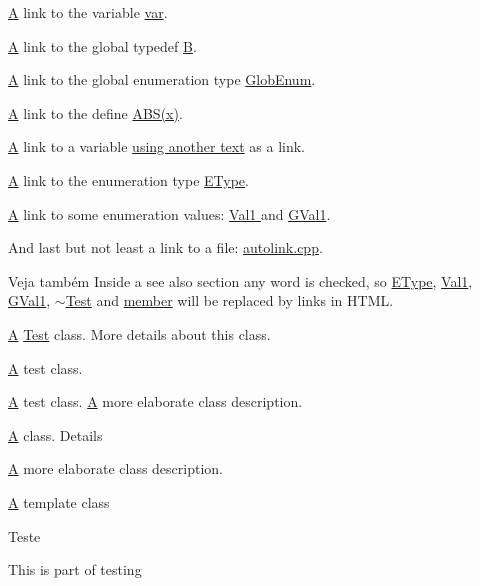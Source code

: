 \hyperlink{class_a}{A} link to the variable \hyperlink{class_test_a96c77f9f3a7baec84b9b8add26a31787}{var}.

\hyperlink{class_a}{A} link to the global typedef \hyperlink{class_b}{B}.

\hyperlink{class_a}{A} link to the global enumeration type \hyperlink{autolink_8cpp_a656d63cf384d2a6f23c2c18523a7bc5e}{Glob\-Enum}.

\hyperlink{class_a}{A} link to the define \hyperlink{autolink_8cpp_a996f7be338ccb40d1a2a5abc1ad61759}{A\-B\-S(x)}.

\hyperlink{class_a}{A} link to a variable \hyperlink{class_test_a96c77f9f3a7baec84b9b8add26a31787}{using another text} as a link.

\hyperlink{class_a}{A} link to the enumeration type \hyperlink{class_test_ad5d0e87f61ba99c47a539492df7917a1}{E\-Type}.

\hyperlink{class_a}{A} link to some enumeration values\-: \hyperlink{class_test_a33e3643b66dfa91e4fb7cc663a23e166a666babebc56e0521d9ee64fe867ba74f}{Val1 } and \hyperlink{autolink_8cpp_a656d63cf384d2a6f23c2c18523a7bc5ea0f016f49e4f3bcd072319b9d68bc927d}{G\-Val1}.

And last but not least a link to a file\-: \hyperlink{autolink_8cpp}{autolink.\-cpp}.

\begin{DoxySeeAlso}{Veja também}
Inside a see also section any word is checked, so \hyperlink{class_test_ad5d0e87f61ba99c47a539492df7917a1}{E\-Type}, \hyperlink{class_test_a33e3643b66dfa91e4fb7cc663a23e166a666babebc56e0521d9ee64fe867ba74f}{Val1}, \hyperlink{autolink_8cpp_a656d63cf384d2a6f23c2c18523a7bc5ea0f016f49e4f3bcd072319b9d68bc927d}{G\-Val1}, \hyperlink{class_test_a6fba67d17f23fe2f810e5f79f4e91538}{$\sim$\-Test} and \hyperlink{class_test_a596dd7e8230777e2e65779e0da29177b}{member} will be replaced by links in H\-T\-M\-L.
\end{DoxySeeAlso}
\hyperlink{class_a}{A} \hyperlink{class_test}{Test} class. More details about this class.

\hyperlink{class_a}{A} test class.

\hyperlink{class_a}{A} test class. \hyperlink{class_a}{A} more elaborate class description.

\hyperlink{class_a}{A} class. Details

\hyperlink{class_a}{A} more elaborate class description.

\hyperlink{class_a}{A} template class

\begin{DoxyRefDesc}{Teste}
\item[\hyperlink{test__test000001}{Teste}]This is part of testing \end{DoxyRefDesc}


